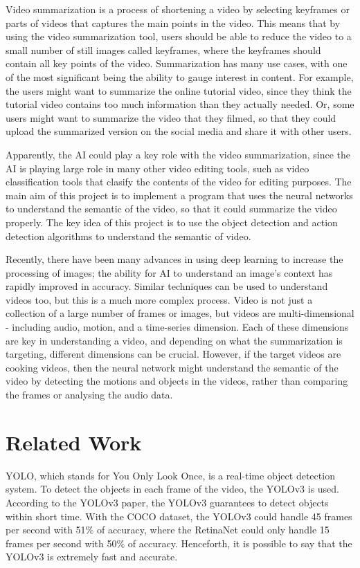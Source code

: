 \documentclass{article}
\begin{document}
Video summarization is a process of shortening a video by selecting keyframes or parts of videos that captures the main points in the video. This means that by using the video summarization tool, users should be able to reduce the video to a small number of still images called keyframes, where the keyframes should contain all key points of the video. Summarization has many use cases, with one of the most significant being the ability to gauge interest in content. For example, the users might want to summarize the online tutorial video, since they think the tutorial video contains too much information than they actually needed. Or, some users might want to summarize the video that they filmed, so that they could upload the summarized version on the social media and share it with other users.

Apparently, the AI could play a key role with the video summarization, since the AI is playing large role in many other video editing tools, such as video classification tools that clasify the contents of the video for editing purposes. The main aim of this project is to implement a program that uses the neural networks to understand the semantic of the video, so that it could summarize the video properly. The key idea of this project is to use the object detection and action detection algorithms to understand the semantic of video.

Recently, there have been many advances in using deep learning to increase the processing of images; the ability for AI to understand an image’s context has rapidly improved in accuracy. Similar techniques can be used to understand videos too, but this is a much more complex process. Video is not just a collection of a large number of frames or images, but videos are multi-dimensional - including audio, motion, and a time-series dimension. Each of these dimensions are key in understanding a video, and depending on what the summarization is targeting, different dimensions can be crucial. However, if the target videos are cooking videos, then the neural network might understand the semantic of the video by detecting the motions and objects in the videos, rather than comparing the frames or analysing the audio data.

\section{Related Work}

YOLO, which stands for You Only Look Once, is a real-time object detection system. To detect the objects in each frame of the video, the YOLOv3 is used. According to the \hypertarget{ref2}{YOLOv3 paper}, the YOLOv3 guarantees to detect objects within short time. With the COCO dataset, the YOLOv3 could handle 45 frames per second with 51\% of accuracy, where the RetinaNet could only handle 15 frames per second with 50\% of accuracy. Henceforth, it is possible to say that the YOLOv3 is extremely fast and accurate.
\end{document}
